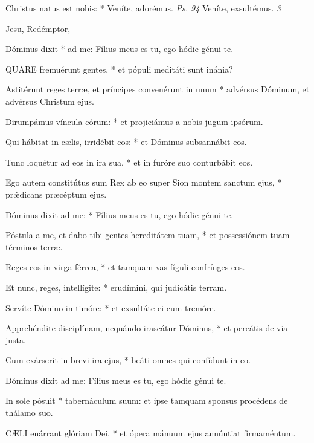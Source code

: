 

 Christus natus est nobis: * Veníte, adorémus. \textit{Ps. 94} Veníte, exsultémus. \textit{3}

 Jesu, Redémptor, 


 Dóminus dixit * ad me: Fílius meus es tu, ego hódie génui te.


\lettrine[lines=2]{Q}{UARE} fremuérunt gentes, * et pópuli meditáti sunt inánia?

Astitérunt reges terræ, et príncipes convenérunt in unum * advérsus Dóminum, et advérsus Christum ejus.

Dirumpámus víncula eórum: * et projiciámus a nobis jugum ipsórum.

Qui hábitat in cælis, irridébit eos: * et Dóminus subsannábit eos.

Tunc loquétur ad eos in ira sua, * et in furóre suo conturbábit eos.

Ego autem constitútus sum Rex ab eo super Sion montem sanctum ejus, * prǽdicans præcéptum ejus.

Dóminus dixit ad me: * Fílius meus es tu, ego hódie génui te.

Póstula a me, et dabo tibi gentes hereditátem tuam, * et possessiónem tuam términos terræ.

Reges eos in virga férrea, * et tamquam vas fíguli confrínges eos.

Et nunc, reges, intellígite: * erudímini, qui judicátis terram.

Servíte Dómino in timóre: * et exsultáte ei cum tremóre.

Apprehéndite disciplínam, nequándo irascátur Dóminus, * et pereátis de via justa.

Cum exárserit in brevi ira ejus, * beáti omnes qui confídunt in eo.

 Dóminus dixit ad me: Fílius meus es tu, ego hódie génui te.

 In sole pósuit * tabernáculum suum: et ipse tamquam sponsus procédens de thálamo suo.


\lettrine[lines=2]{C}{ÆLI} enárrant glóriam Dei, * et ópera mánuum ejus annúntiat firmaméntum.

